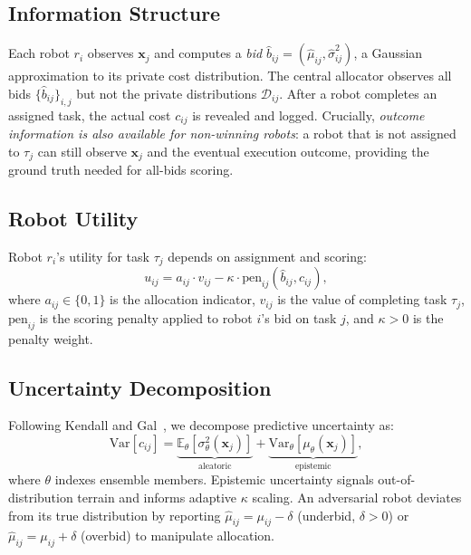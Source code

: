 \documentclass[letterpaper, 10pt, conference]{ieeeconf}
\begin{document}
\subsection{Information Structure}
Each robot $r_i$ observes $\mathbf{x}_j$ and computes a \emph{bid}
$\hat{b}_{ij} = (\hat{\mu}_{ij}, \hat{\sigma}^2_{ij})$, a Gaussian
approximation to its private cost distribution.  The central allocator
observes all bids $\{\hat{b}_{ij}\}_{i,j}$ but not the private distributions
$\mathcal{D}_{ij}$.  After a robot completes an assigned task, the actual cost
$c_{ij}$ is revealed and logged.  Crucially, \emph{outcome information is also
available for non-winning robots}: a robot that is not assigned to $\tau_j$
can still observe $\mathbf{x}_j$ and the eventual execution outcome,
providing the ground truth needed for all-bids scoring.

\subsection{Robot Utility}
Robot $r_i$'s utility for task $\tau_j$ depends on assignment and scoring:
\begin{equation}
  u_{ij} = a_{ij} \cdot v_{ij} - \kappa \cdot \text{pen}_{ij}(\hat{b}_{ij}, c_{ij}),
  \label{eq:utility}
\end{equation}
where $a_{ij} \in \{0,1\}$ is the allocation indicator, $v_{ij}$ is the
value of completing task $\tau_j$, $\text{pen}_{ij}$ is the scoring penalty
applied to robot $i$'s bid on task $j$, and $\kappa > 0$ is the penalty
weight.

\subsection{Uncertainty Decomposition}
Following Kendall and Gal~\cite{kendall2017uncertainties}, we decompose
predictive uncertainty as:
\begin{equation}
  \text{Var}[c_{ij}] = \underbrace{\mathbb{E}_\theta[\sigma^2_\theta(\mathbf{x}_j)]}_{\text{aleatoric}} + \underbrace{\text{Var}_\theta[\mu_\theta(\mathbf{x}_j)]}_{\text{epistemic}},
  \label{eq:decomp}
\end{equation}
where $\theta$ indexes ensemble members.  Epistemic uncertainty signals
out-of-distribution terrain and informs adaptive $\kappa$ scaling.  An
adversarial robot deviates from its true distribution by reporting
$\hat{\mu}_{ij} = \mu_{ij} - \delta$ (underbid, $\delta > 0$) or
$\hat{\mu}_{ij} = \mu_{ij} + \delta$ (overbid) to manipulate allocation.
\end{document}
